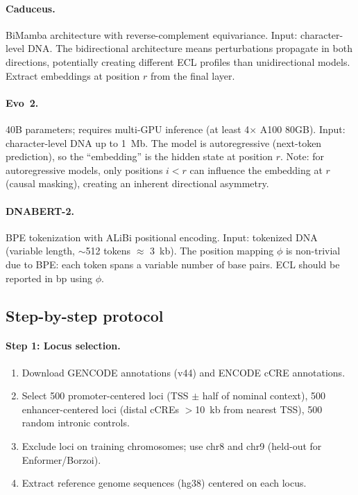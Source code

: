 \paragraph{Caduceus.}
BiMamba architecture with reverse-complement equivariance. Input: character-level DNA. The bidirectional architecture means perturbations propagate in both directions, potentially creating different ECL profiles than unidirectional models. Extract embeddings at position $r$ from the final layer.

\paragraph{Evo~2.}
40B parameters; requires multi-GPU inference (at least 4$\times$ A100 80GB). Input: character-level DNA up to 1~Mb. The model is autoregressive (next-token prediction), so the ``embedding'' is the hidden state at position $r$. Note: for autoregressive models, only positions $i < r$ can influence the embedding at $r$ (causal masking), creating an inherent directional asymmetry.

\paragraph{DNABERT-2.}
BPE tokenization with ALiBi positional encoding. Input: tokenized DNA (variable length, $\sim$512 tokens $\approx$ 3~kb). The position mapping $\phi$ is non-trivial due to BPE: each token spans a variable number of base pairs. ECL should be reported in bp using $\phi$.

\subsection{Step-by-step protocol}

\paragraph{Step 1: Locus selection.}
\begin{enumerate}[leftmargin=2em, label=(1.\arabic*)]
\item Download GENCODE annotations (v44) and ENCODE cCRE annotations.
\item Select 500 promoter-centered loci (TSS $\pm$ half of nominal context), 500 enhancer-centered loci (distal cCREs $>$10~kb from nearest TSS), 500 random intronic controls.
\item Exclude loci on training chromosomes; use chr8 and chr9 (held-out for Enformer/Borzoi).
\item Extract reference genome sequences (hg38) centered on each locus.
\end{enumerate}

